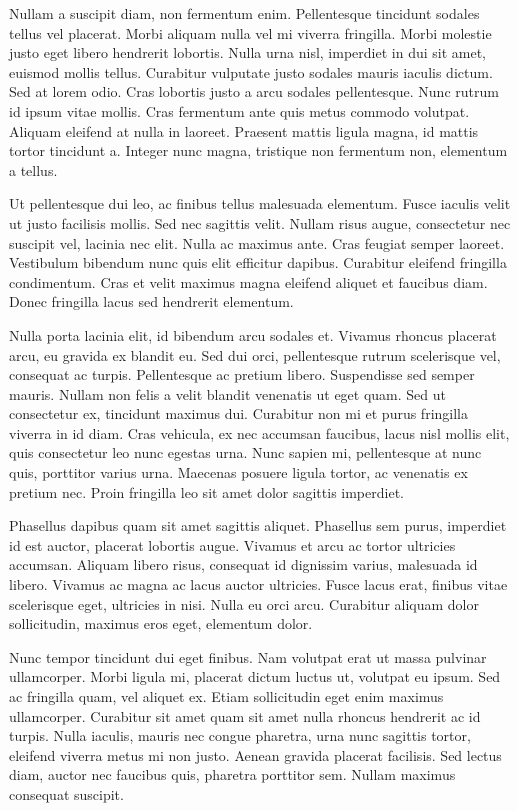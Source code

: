 Nullam a suscipit diam, non fermentum enim. Pellentesque tincidunt sodales tellus vel placerat. Morbi aliquam nulla vel mi viverra fringilla. Morbi molestie justo eget libero hendrerit lobortis. Nulla urna nisl, imperdiet in dui sit amet, euismod mollis tellus. Curabitur vulputate justo sodales mauris iaculis dictum. Sed at lorem odio. Cras lobortis justo a arcu sodales pellentesque. Nunc rutrum id ipsum vitae mollis. Cras fermentum ante quis metus commodo volutpat. Aliquam eleifend at nulla in laoreet. Praesent mattis ligula magna, id mattis tortor tincidunt a. Integer nunc magna, tristique non fermentum non, elementum a tellus.

Ut pellentesque dui leo, ac finibus tellus malesuada elementum. Fusce iaculis velit ut justo facilisis mollis. Sed nec sagittis velit. Nullam risus augue, consectetur nec suscipit vel, lacinia nec elit. Nulla ac maximus ante. Cras feugiat semper laoreet. Vestibulum bibendum nunc quis elit efficitur dapibus. Curabitur eleifend fringilla condimentum. Cras et velit maximus magna eleifend aliquet et faucibus diam. Donec fringilla lacus sed hendrerit elementum.

Nulla porta lacinia elit, id bibendum arcu sodales et. Vivamus rhoncus placerat arcu, eu gravida ex blandit eu. Sed dui orci, pellentesque rutrum scelerisque vel, consequat ac turpis. Pellentesque ac pretium libero. Suspendisse sed semper mauris. Nullam non felis a velit blandit venenatis ut eget quam. Sed ut consectetur ex, tincidunt maximus dui. Curabitur non mi et purus fringilla viverra in id diam. Cras vehicula, ex nec accumsan faucibus, lacus nisl mollis elit, quis consectetur leo nunc egestas urna. Nunc sapien mi, pellentesque at nunc quis, porttitor varius urna. Maecenas posuere ligula tortor, ac venenatis ex pretium nec. Proin fringilla leo sit amet dolor sagittis imperdiet.

Phasellus dapibus quam sit amet sagittis aliquet. Phasellus sem purus, imperdiet id est auctor, placerat lobortis augue. Vivamus et arcu ac tortor ultricies accumsan. Aliquam libero risus, consequat id dignissim varius, malesuada id libero. Vivamus ac magna ac lacus auctor ultricies. Fusce lacus erat, finibus vitae scelerisque eget, ultricies in nisi. Nulla eu orci arcu. Curabitur aliquam dolor sollicitudin, maximus eros eget, elementum dolor.

Nunc tempor tincidunt dui eget finibus. Nam volutpat erat ut massa pulvinar ullamcorper. Morbi ligula mi, placerat dictum luctus ut, volutpat eu ipsum. Sed ac fringilla quam, vel aliquet ex. Etiam sollicitudin eget enim maximus ullamcorper. Curabitur sit amet quam sit amet nulla rhoncus hendrerit ac id turpis. Nulla iaculis, mauris nec congue pharetra, urna nunc sagittis tortor, eleifend viverra metus mi non justo. Aenean gravida placerat facilisis. Sed lectus diam, auctor nec faucibus quis, pharetra porttitor sem. Nullam maximus consequat suscipit.

